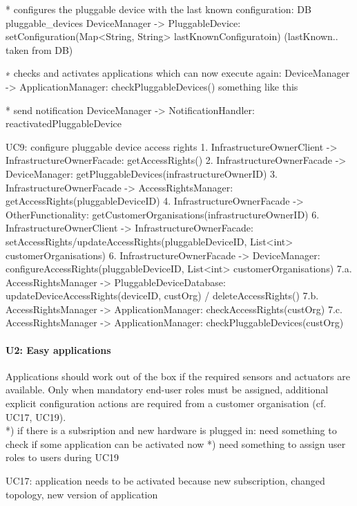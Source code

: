                 * configures the pluggable device with the last known configuration: DB pluggable_devices
                    DeviceManager -> PluggableDevice: setConfiguration(Map<String, String> lastKnownConfiguratoin) (lastKnown.. taken from DB)

                ∗ checks and activates applications which can now execute again:
                    DeviceManager -> ApplicationManager: checkPluggableDevices() something like this

                * send notification
                    DeviceManager -> NotificationHandler: reactivatedPluggableDevice

        UC9: configure pluggable device access rights
            1. InfrastructureOwnerClient -> InfrastructureOwnerFacade: getAccessRights()
                2. InfrastructureOwnerFacade -> DeviceManager: getPluggableDevices(infrastructureOwnerID)
                3. InfrastructureOwnerFacade -> AccessRightsManager: getAccessRights(pluggableDeviceID)
                4. InfrastructureOwnerFacade -> OtherFunctionality: getCustomerOrganisations(infrastructureOwnerID)
            6. InfrastructureOwnerClient -> InfrastructureOwnerFacade: setAccessRights/updateAccessRights(pluggableDeviceID, List<int> customerOrganisations)
                6. InfrastructureOwnerFacade -> DeviceManager: configureAccessRights(pluggableDeviceID, List<int> customerOrganisations)
                7.a. AccessRightsManager -> PluggableDeviceDatabase: updateDeviceAccessRights(deviceID, custOrg) / deleteAccessRights()
                7.b. AccessRightsManager -> ApplicationManager: checkAccessRights(custOrg)
                7.c. AccessRightsManager -> ApplicationManager: checkPluggableDevices(custOrg)


    \paragraph{U2: Easy applications}
        Applications should work out of the box if the required sensors and
        actuators are available. Only when mandatory end-user roles must be
        assigned, additional explicit configuration actions are required
        from a customer organisation (cf. UC17, UC19). \\
        *) if there is a subsription and new hardware is plugged in: need something to check
           if some application can be activated now
        *) need something to assign user roles to users during UC19

        UC17:
            application needs to be activated because new subscription, changed topology, new version of application

